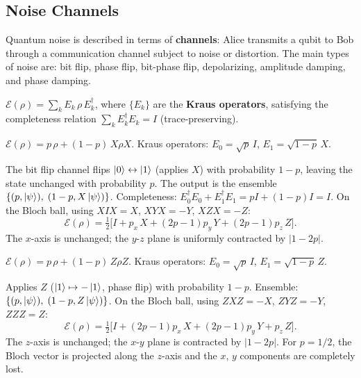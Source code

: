 \documentclass[10pt,a4paper]{article}
\begin{document}
\subsection{Noise Channels}

Quantum noise is described in terms of \textbf{channels}: Alice transmits a qubit to Bob through a communication channel subject to noise or distortion. The main types of noise are: bit flip, phase flip, bit-phase flip, depolarizing, amplitude damping, and phase damping.

\begin{tcolorbox}[defstyle, title={Kraus Representation (Operator-Sum Representation)}]
$\mathcal{E}(\rho)=\sum_k E_k\,\rho\, E_k^\dagger$, where $\{E_k\}$ are the \textbf{Kraus operators}, satisfying the completeness relation $\sum_k E_k^\dagger E_k=I$ (trace-preserving).
\end{tcolorbox}

\begin{tcolorbox}[defstyle, title={Definition: Bit Flip Channel}]
$\mathcal{E}(\rho)=p\,\rho+(1-p)\,X\rho X$. Kraus operators: $E_0=\sqrt{p}\,I$, $E_1=\sqrt{1-p}\,X$.
\end{tcolorbox}

The bit flip channel flips $\ket{0}\leftrightarrow\ket{1}$ (applies $X$) with probability $1-p$, leaving the state unchanged with probability $p$. The output is the ensemble $\{(p,\ket{\psi}),\;(1-p,X\ket{\psi})\}$. Completeness: $E_0^\dagger E_0+E_1^\dagger E_1=pI+(1-p)I=I$. On the Bloch ball, using $XIX=X$, $XYX=-Y$, $XZX=-Z$:
\[
\mathcal{E}(\rho)=\tfrac{1}{2}\bigl[I+p_x\,X+(2p-1)p_y\,Y+(2p-1)p_z\,Z\bigr].
\]
The $x$-axis is unchanged; the $y$-$z$ plane is uniformly contracted by $|1-2p|$.

\begin{tcolorbox}[defstyle, title={Definition: Phase Flip (Dephasing) Channel}]
$\mathcal{E}(\rho)=p\,\rho+(1-p)\,Z\rho Z$. Kraus operators: $E_0=\sqrt{p}\,I$, $E_1=\sqrt{1-p}\,Z$.
\end{tcolorbox}

Applies $Z$ ($\ket{1}\mapsto -\ket{1}$, phase flip) with probability $1-p$. Ensemble: $\{(p,\ket{\psi}),\;(1-p,Z\ket{\psi})\}$. On the Bloch ball, using $ZXZ=-X$, $ZYZ=-Y$, $ZZZ=Z$:
\[
\mathcal{E}(\rho)=\tfrac{1}{2}\bigl[I+(2p-1)p_x\,X+(2p-1)p_y\,Y+p_z\,Z\bigr].
\]
The $z$-axis is unchanged; the $x$-$y$ plane is contracted by $|1-2p|$. For $p=1/2$, the Bloch vector is projected along the $z$-axis and the $x$, $y$ components are completely lost.
\end{document}
